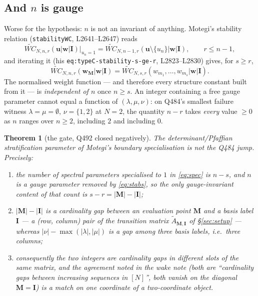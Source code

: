 \documentclass[11pt]{article}
\theoremstyle{plain}
\newtheorem{thm}{Theorem}
\theoremstyle{definition}
\theoremstyle{remark}
\theoremstyle{plain}
\newcommand{\bI}{\mathbf{I}}
\newcommand{\bM}{\mathbf{M}}
\newcommand{\bu}{\mathbf{u}}
\newcommand{\bw}{\mathbf{w}}
\newcommand{\WCt}{\widetilde{WC}}
\newcommand{\At}{\widetilde{A}}
\begin{document}
\subsection{And $n$ is gauge}

Worse for the hypothesis: $n$ is not an invariant of anything.  Motegi's
stability relation (\texttt{stabilityWC}, L2641--L2647) reads
\begin{equation}
\WCt_{N,n,r}(\bu|\bw|\bI)\big|_{u_n=1}
=\WCt_{N,n-1,r}(\bu\setminus\{u_n\}|\bw|\bI),
\qquad r\le n-1,
\label{eq:stab}
\end{equation}
and iterating it (his \texttt{eq:typeC-stability-s-ge-r}, L2823--L2830) gives,
for $s\ge r$,
\begin{equation}
\WCt_{N,n,r}(\bw_{\bM}|\bw|\bI)=\WCt_{N,s,r}(w_{m_1},\dots,w_{m_s}|\bw|\bI).
\label{eq:stabs}
\end{equation}
The normalised weight function --- and therefore every structure constant built
from it --- is \emph{independent of $n$} once $n\ge s$.  An integer containing a
free gauge parameter cannot equal a function of $(\lambda,\mu,\nu)$: on Q484's
smallest failure witness $\lambda=\mu=\emptyset$, $\nu=\{1,2\}$ at $N=2$, the
quantity $n-r$ takes \emph{every} value $\ge0$ as $n$ ranges over $n\ge2$,
including $2$ and including $0$.

\begin{thm}[the gate, Q492 closed negatively]
\label{thm:gate}
The determinant/Pfaffian stratification parameter of Motegi's boundary
specialisation is not the Q484 jump.  Precisely:
\begin{enumerate}
\item[(i)] the number of spectral parameters specialised to $1$ in
\eqref{eq:spec} is $n-s$, and $n$ is a gauge parameter removed by
\eqref{eq:stabs}, so the only gauge-invariant content of that count is
$s-r=|\bM|-|\bI|$;
\item[(ii)] $|\bM|-|\bI|$ is a cardinality gap between an \emph{evaluation
point} $\bM$ and a \emph{basis label} $\bI$ --- a (row, column) pair of the
transition matrix $\At_{\bM,\bI}$ of \S\ref{sec:setup} --- whereas
$|\nu|-\max(|\lambda|,|\mu|)$ is a gap among \emph{three basis labels}, i.e.\
three columns;
\item[(iii)] consequently the two integers are cardinality gaps in different
slots of the same matrix, and the agreement noted in the wake note (both are
``cardinality gaps between increasing sequences in $[N]$'', both vanish on the
diagonal $\bM=\bI$) is a match on one coordinate of a two-coordinate object.
\end{enumerate}
\end{thm}
\end{document}
